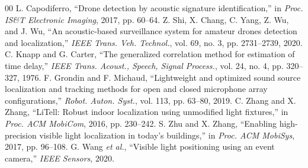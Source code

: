 \documentclass[conference]{IEEEtran}
\begin{document}
\begin{thebibliography}{00}
L. Capodiferro, ``Drone detection by acoustic signature
identification,'' in \emph{Proc. IS\&T Electronic Imaging}, 2017,
pp. 60--64.
 Z. Shi, X. Chang, C. Yang, Z. Wu, and J. Wu, ``An
acoustic-based surveillance system for amateur drones detection and
localization,'' \emph{IEEE Trans. Veh. Technol.}, vol. 69, no. 3,
pp. 2731--2739, 2020.
 C. Knapp and G. Carter, ``The generalized correlation
method for estimation of time delay,'' \emph{IEEE Trans. Acoust., Speech,
Signal Process.}, vol. 24, no. 4, pp. 320--327, 1976.
 F. Grondin and F. Michaud, ``Lightweight and
optimized sound source localization and tracking methods for open and
closed microphone array configurations,'' \emph{Robot. Auton. Syst.},
vol. 113, pp. 63--80, 2019.
 C. Zhang and X. Zhang, ``LiTell: Robust indoor
localization using unmodified light fixtures,'' in \emph{Proc. ACM
MobiCom}, 2016, pp. 230--242.
 S. Zhu and X. Zhang, ``Enabling high-precision
visible light localization in today's buildings,'' in \emph{Proc. ACM
MobiSys}, 2017, pp. 96--108.
 G. Wang \emph{et al.}, ``Visible light positioning
using an event camera,'' \emph{IEEE Sensors}, 2020.
\end{thebibliography}
\end{document}
